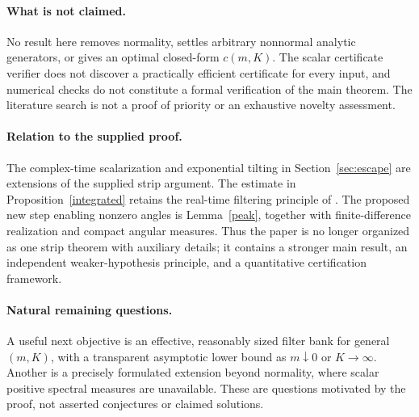 \documentclass[11pt,a4paper]{article}
\theoremstyle{definition}\newtheorem{definition}[theorem]{Definition}
\theoremstyle{remark}\newtheorem{remark}[theorem]{Remark}
\begin{document}
\paragraph{What is not claimed.}
No result here removes normality, settles arbitrary nonnormal analytic generators, or gives an optimal closed-form $c(m,K)$. The scalar certificate verifier does not discover a practically efficient certificate for every input, and numerical checks do not constitute a formal verification of the main theorem. The literature search is not a proof of priority or an exhaustive novelty assessment.

\paragraph{Relation to the supplied proof.}
The complex-time scalarization and exponential tilting in Section~\ref{sec:escape} are extensions of the supplied strip argument. The estimate in Proposition~\ref{integrated} retains the real-time filtering principle of \cite{DJ26}. The proposed new step enabling nonzero angles is Lemma~\ref{peak}, together with finite-difference realization and compact angular measures. Thus the paper is no longer organized as one strip theorem with auxiliary details; it contains a stronger main result, an independent weaker-hypothesis principle, and a quantitative certification framework.

\paragraph{Natural remaining questions.}
A useful next objective is an effective, reasonably sized filter bank for general $(m,K)$, with a transparent asymptotic lower bound as $m\downarrow0$ or $K\to\infty$. Another is a precisely formulated extension beyond normality, where scalar positive spectral measures are unavailable. These are questions motivated by the proof, not asserted conjectures or claimed solutions.

\appendix
\end{document}
